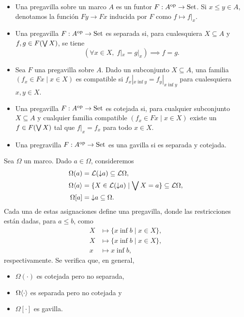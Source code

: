 \begin{defn}
    \leavevmode
    \begin{itemize}
        \item
        Una pregavilla sobre un marco $A$
        es un funtor $F:A^{\mathrm{op}}\to\mathrm{Set}$.
        Si $x\leq y\in A$, denotamos la función
        $Fy\to Fx$ inducida por $F$ como $f\mapsto f|_x$.
        \item
        Una pregavilla $F:A^{\mathrm{op}}\to\mathrm{Set}$ es separada si,
        para cualesquiera $X\subseteq A$ y $f,g\in F(\bigvee X)$,
        se tiene
        \[
            (\forall x\in X,\; f|_x=g|_x)\implies f=g
        .\]
        \item
        Sea $F$ una pregavilla sobre $A$.
        Dado un subconjunto $X\subseteq A$,
        una familia $(f_x\in Fx\mid x\in X)$
        es compatible si $f_x|_{x\inf y}=f_y|_{x\inf y}$
        para cualesquiera $x,y\in X$.
        \item
        Una pregavilla $F:A^{\mathrm{op}}\to\mathrm{Set}$ es cotejada si,
        para cualquier subconjunto $X\subseteq A$
        y cualquier familia compatible
        $(f_x\in Fx\mid x\in X)$
        existe un $f\in F(\bigvee X)$ tal que
        $f|_x=f_x$ para todo $x\in X$.
        \item
        Una pregravilla $F:A^{\mathrm{op}}\to\mathrm{Set}$ es una gavilla
        si es separada y cotejada.
    \end{itemize}
\end{defn}

\begin{exa}
    Sea $\Omega$ un marco.
    Dado $a\in\Omega$, consideremos
    \begin{align*}
        \Omega(a)
            &= \mathcal{L}({\downarrow} a)
            \subseteq\mathcal{L}\Omega, \\
        \Omega\langle a\rangle
            &= \{X\in\mathcal{L}({\downarrow} a)\mid\bigvee X=a\}
            \subseteq\mathcal{L}\Omega, \\
        \Omega[a]
            &= {\downarrow} a
            \subseteq\Omega.
    \end{align*}
    Cada una de estas asignaciones define una pregavilla,
    donde las restricciones están dadas, para $a\leq b$, como
    \begin{align*}
        X &\mapsto \{x\inf b\mid x\in X\}, \\
        X &\mapsto \{x\inf b\mid x\in X\}, \\
        x &\mapsto x\inf b,
    \end{align*}
    respectivamente.
    Se verifica que, en general,
    \begin{itemize}
        \item $\Omega(\cdot)$ es cotejada pero no separada,
        \item $\Omega\langle\cdot\rangle$ es separada pero no cotejada y
        \item $\Omega[\cdot]$ es gavilla.
    \end{itemize}
\end{exa}

